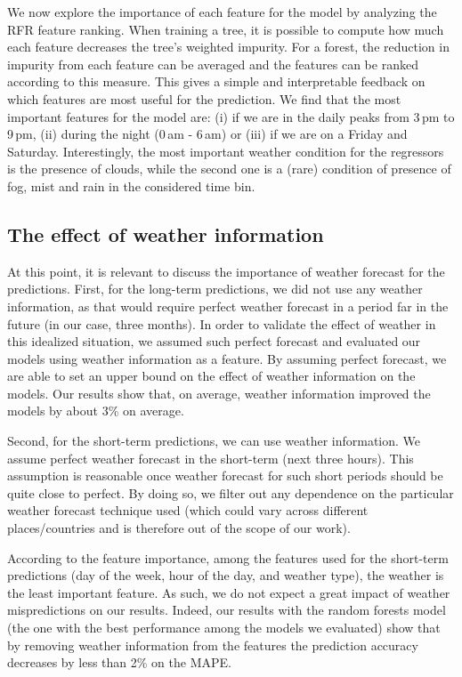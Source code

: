 We now explore the importance of each feature for the model by analyzing the RFR feature ranking.  
When training a tree, it is possible to compute how much each feature decreases the tree's weighted impurity. For a forest, the reduction in impurity from each feature can be averaged and the features can be ranked according to this measure. This gives a simple and interpretable feedback on which features are most useful for the prediction. 
We find that the most important features for the model are: (i) if we are in the daily peaks from 3\,pm to 9\,pm, (ii) during the night (0\,am - 6\,am) or (iii) if we are on a Friday and Saturday. Interestingly, the most important weather condition for the regressors is the presence of clouds, while the second one is a (rare) condition of presence of fog, mist and rain in the considered time bin. 

\subsection{The effect of weather information}

At this point, it is relevant to discuss the importance of weather forecast for the predictions.
First, for the long-term predictions, we did not use any weather information, as that would require perfect weather forecast in a period far in the future (in our case, three months). In order to validate the effect of weather in this idealized situation, we assumed such perfect forecast and evaluated our models using weather information as a feature. By assuming perfect forecast, we are able to set an upper bound on the effect of weather information on the models. Our results show that, on average, weather information improved the models by about 3\% on average.

Second, for the short-term predictions, we can use weather information. We assume perfect weather forecast in the short-term (next three hours). This assumption is reasonable once weather forecast for such short periods should be quite close to perfect. By doing so, we filter out any dependence on the particular weather forecast technique used (which could vary across different places/countries and is therefore out of the scope of our work). 

According to the feature importance, among the features used for the short-term predictions (day of the week, hour of the day, and weather type), the weather is the least important feature. As such, we do not expect a great impact of weather mispredictions on our results. Indeed, our results with the random forests model (the one with the best performance among the models we evaluated) show that by removing weather information from the features the prediction accuracy decreases  by less than 2\% on the MAPE.
